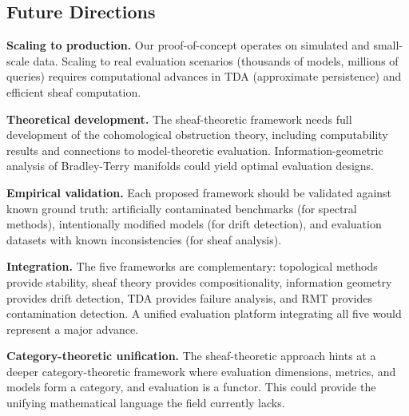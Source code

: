 \documentclass[11pt]{article}
\begin{document}
\subsection{Future Directions}

\textbf{Scaling to production.} Our proof-of-concept operates on simulated and small-scale data. Scaling to real evaluation scenarios (thousands of models, millions of queries) requires computational advances in TDA (approximate persistence) and efficient sheaf computation.

\textbf{Theoretical development.} The sheaf-theoretic framework needs full development of the cohomological obstruction theory, including computability results and connections to model-theoretic evaluation. Information-geometric analysis of Bradley-Terry manifolds could yield optimal evaluation designs.

\textbf{Empirical validation.} Each proposed framework should be validated against known ground truth: artificially contaminated benchmarks (for spectral methods), intentionally modified models (for drift detection), and evaluation datasets with known inconsistencies (for sheaf analysis).

\textbf{Integration.} The five frameworks are complementary: topological methods provide stability, sheaf theory provides compositionality, information geometry provides drift detection, TDA provides failure analysis, and RMT provides contamination detection. A unified evaluation platform integrating all five would represent a major advance.

\textbf{Category-theoretic unification.} The sheaf-theoretic approach hints at a deeper category-theoretic framework where evaluation dimensions, metrics, and models form a category, and evaluation is a functor. This could provide the unifying mathematical language the field currently lacks.





\end{document}
